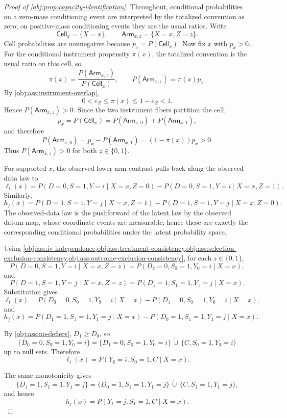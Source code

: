 \documentclass[11pt]{article}
\begin{document}
\begin{proof}[Proof of \cref{obj:prop:capacity-identification}]
Throughout, conditional probabilities on a zero-mass conditioning event are interpreted by the totalized convention as zero; on positive-mass conditioning events they are the usual ratios.  Write
\[
\mathsf{Cell}_x=\{X=x\},\qquad
\mathsf{Arm}_{x,z}=\{X=x,Z=z\}.
\]
Cell probabilities are nonnegative because \(p_x=P(\mathsf{Cell}_x)\).  Now fix \(x\) with \(p_x>0\).  For the conditional instrument propensity \(\pi(x)\), the totalized convention is the usual ratio on this cell, so
\[
\pi(x)=\frac{P(\mathsf{Arm}_{x,1})}{P(\mathsf{Cell}_x)},
\qquad
P(\mathsf{Arm}_{x,1})=\pi(x)p_x .
\]
By \cref{obj:ass:instrument-overlap},
\[
0<\varepsilon_Z\le \pi(x)\le 1-\varepsilon_Z<1.
\]
Hence \(P(\mathsf{Arm}_{x,1})>0\).  Since the two instrument fibers partition the cell,
\[
p_x=P(\mathsf{Cell}_x)=P(\mathsf{Arm}_{x,0})+P(\mathsf{Arm}_{x,1}),
\]
and therefore
\[
P(\mathsf{Arm}_{x,0})=p_x-P(\mathsf{Arm}_{x,1})=(1-\pi(x))p_x>0.
\]
Thus \(P(\mathsf{Arm}_{x,z})>0\) for both \(z\in\{0,1\}\).

For supported \(x\), the observed lower-arm contrast pulls back along the observed-data law to
\[
\ell_i(x)
=
P(D=0,S=1,Y=i\mid X=x,Z=0)
-
P(D=0,S=1,Y=i\mid X=x,Z=1).
\]
Similarly,
\[
h_j(x)
=
P(D=1,S=1,Y=j\mid X=x,Z=1)
-
P(D=1,S=1,Y=j\mid X=x,Z=0).
\]
The observed-data law is the pushforward of the latent law by the observed datum map, whose coordinate events are measurable; hence these are exactly the corresponding conditional probabilities under the latent probability space.

Using \cref{obj:ass:iv-independence,obj:ass:treatment-consistency,obj:ass:selection-exclusion-consistency,obj:ass:outcome-exclusion-consistency}, for each \(z\in\{0,1\}\),
\[
P(D=0,S=1,Y=i\mid X=x,Z=z)
=
P(D_z=0,S_0=1,Y_0=i\mid X=x),
\]
and
\[
P(D=1,S=1,Y=j\mid X=x,Z=z)
=
P(D_z=1,S_1=1,Y_1=j\mid X=x).
\]
Substitution gives
\[
\ell_i(x)
=
P(D_0=0,S_0=1,Y_0=i\mid X=x)
-
P(D_1=0,S_0=1,Y_0=i\mid X=x),
\]
and
\[
h_j(x)
=
P(D_1=1,S_1=1,Y_1=j\mid X=x)
-
P(D_0=1,S_1=1,Y_1=j\mid X=x).
\]

By \cref{obj:ass:no-defiers}, \(D_1\ge D_0\), so
\[
\{D_0=0,S_0=1,Y_0=i\}
=
\{D_1=0,S_0=1,Y_0=i\}\,\dot\cup\,
\{C,S_0=1,Y_0=i\}
\]
up to null sets.  Therefore
\[
\ell_i(x)=P(Y_0=i,S_0=1,C\mid X=x).
\]

The same monotonicity gives
\[
\{D_1=1,S_1=1,Y_1=j\}
=
\{D_0=1,S_1=1,Y_1=j\}\,\dot\cup\,
\{C,S_1=1,Y_1=j\},
\]
and hence
\[
h_j(x)=P(Y_1=j,S_1=1,C\mid X=x).
\]


\end{proof}
\end{document}
